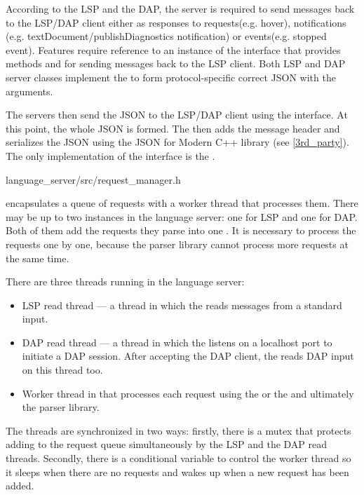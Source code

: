 According to the LSP and the DAP, the server is required to send messages back to the LSP/DAP client either as responses to requests(e.g. hover), notifications (e.g. textDocument/publishDiagnostics notification) or events(e.g. stopped event). Features require reference to an instance of the  interface that provides methods  and  for sending messages back to the LSP client. Both LSP and DAP server classes implement the  to form protocol-specific correct JSON with the arguments.

The servers then send the JSON to the LSP/DAP client using the  interface. At this point, the whole JSON is formed. The  then adds the message header and serializes the JSON using the JSON for Modern C++ library (see \cref{3rd_party}). The only implementation of the  interface is the .

{language\_server/src/request\_manager.h}

 encapsulates a queue of requests with a worker thread that processes them. There may be up to two  instances in the language server: one for LSP and one for DAP. Both of them add the requests they parse into one . It is necessary to process the requests one by one, because the parser library cannot process more requests at the same time.

There are three threads running in the language server:
\begin{itemize}
	\item LSP read thread --- a thread in which the  reads messages from a standard input.
	\item DAP read thread --- a thread in which the  listens on a localhost port to initiate a DAP session. After accepting the DAP client, the  reads DAP input on this thread too.
	\item Worker thread in  that processes each request using the  or the  and ultimately the parser library.
\end{itemize}

The threads are synchronized in two ways: firstly, there is a mutex that protects adding to the request queue simultaneously by the LSP and the DAP read threads. Secondly, there is a conditional variable to control the worker thread so it sleeps when there are no requests and wakes up when a new request has been added.

